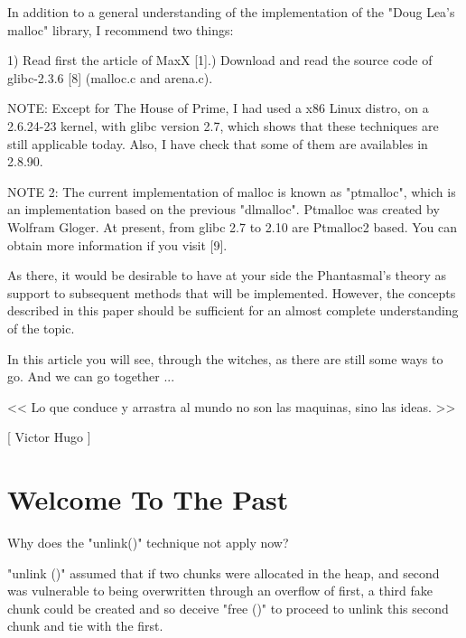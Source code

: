 \documentclass[12pt]{article}
\begin{document}
In addition to a general understanding of the implementation of the "Doug
Lea's malloc" library, I recommend two things:
\newline

   1) Read first the article of MaxX [1].) Download and read the source code of glibc-2.3.6 [8]
      (malloc.c and arena.c).\newline
      
  NOTE: Except for The House of Prime, I had used a x86 Linux distro,
        on a 2.6.24-23 kernel, with glibc version 2.7, which shows
        that these techniques are still applicable today. Also, I have
        check that some of them are availables in 2.8.90.
        

NOTE 2: The current implementation of malloc is known as "ptmalloc",
        which is an implementation based on the previous "dlmalloc".
        Ptmalloc was created by Wolfram Gloger. At present, from glibc
        2.7 to 2.10 are Ptmalloc2 based. You can obtain more information
        if you visit [9].
\newline

As there, it would be desirable to have at your side the Phantasmal's
theory as support to subsequent methods that will be implemented. However,
the concepts described in this paper should be sufficient for an almost
complete understanding of the topic.
\newline

In this article you will see, through the witches, as there are still
some ways to go. And we can go together ...
\newline

\begin{verbnobox}[\small]
                   << Lo que conduce y arrastra
                      al mundo no son las maquinas,
                      sino las ideas. >>

                                    [ Victor Hugo ]
\end{verbnobox}


\section{Welcome To The Past}  

Why does the "unlink()" technique not apply now?
\newline

"unlink ()" assumed that if two chunks were allocated in the heap, and
second was vulnerable to being overwritten through an overflow of first,
a third fake chunk could be created and so deceive "free ()" to proceed
to unlink this second chunk and tie with the first.
\end{document}
